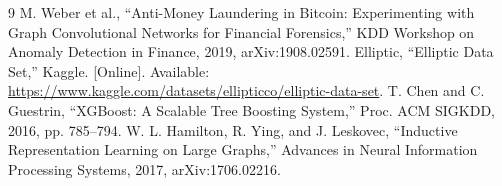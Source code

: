 \documentclass[10pt,twocolumn,letterpaper]{article}
\begin{document}
\begin{thebibliography}{9}
 M. Weber et al., ``Anti-Money Laundering in Bitcoin: Experimenting with Graph Convolutional Networks for Financial Forensics,'' KDD Workshop on Anomaly Detection in Finance, 2019, arXiv:1908.02591.
 Elliptic, ``Elliptic Data Set,'' Kaggle. [Online]. Available: \url{https://www.kaggle.com/datasets/ellipticco/elliptic-data-set}.
 T. Chen and C. Guestrin, ``XGBoost: A Scalable Tree Boosting System,'' Proc. ACM SIGKDD, 2016, pp. 785--794.
 W. L. Hamilton, R. Ying, and J. Leskovec, ``Inductive Representation Learning on Large Graphs,'' Advances in Neural Information Processing Systems, 2017, arXiv:1706.02216.
\end{thebibliography}
\end{document}
